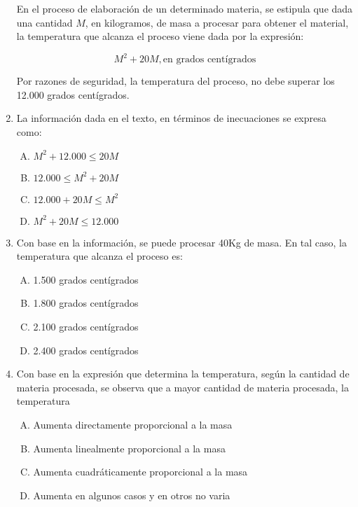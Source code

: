 \begin{enumerate}
\noindent En el proceso de elaboración de un determinado materia, se estipula que dada una cantidad $M$, en kilogramos, de masa a procesar para obtener el material, la temperatura que alcanza el proceso viene dada por la expresión: 

\begin{equation*}
M^2+20M, \text{en grados centígrados}
\end{equation*}

Por razones de seguridad, la temperatura del proceso, no debe superar los 12.000 grados centígrados.

\newpage
\item La información dada en el texto, en términos de inecuaciones se expresa como:  \label{yolma-6}\\

\begin{enumerate}[(A)]
\item  $M^2+12.000\leq 20M$
\item $12.000\leq M^2+20M$
\item $12.000+20M\leq M^2$
\item $M^2+20M\leq 12.000$
\end{enumerate}


\item Con base en la información, se puede procesar 40Kg de masa. En tal caso, la temperatura que alcanza el proceso es:\label{yolma-7}\\

\begin{enumerate}[(A)]
\item  1.500 grados centígrados
\item 1.800 grados centígrados
\item 2.100 grados centígrados
\item 2.400 grados centígrados
\end{enumerate}


\item  Con base en la expresión que determina la temperatura, según la cantidad de materia procesada, se observa que a mayor cantidad de materia procesada,  la temperatura \label{yolma-8}\\

\begin{enumerate}[(A)]
\item  Aumenta directamente proporcional a la masa
\item Aumenta linealmente proporcional a la masa
\item Aumenta cuadráticamente proporcional a la masa
\item Aumenta en algunos casos y en otros no varia
\end{enumerate}


\end{enumerate}
